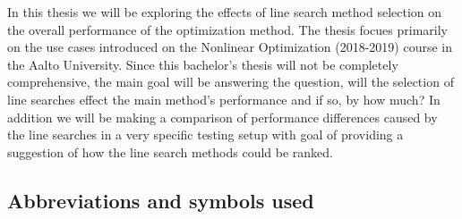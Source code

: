 \documentclass[a4paper,english,titlepage,12pt]{article}
\begin{document}
In this thesis we will be exploring the effects of line search method selection on the overall performance of the optimization method. The thesis focues primarily on the use cases introduced on the Nonlinear Optimization (2018-2019) course in the Aalto University. Since this bachelor's thesis will not be completely comprehensive, the main goal will be answering the question, will the selection of line searches effect the main method's performance and if so, by how much? In addition we will be making a comparison of performance differences caused by the line searches in a very specific testing setup with goal of providing a suggestion of how the line search methods could be ranked.

\subsection*{Abbreviations and symbols used}
\end{document}
